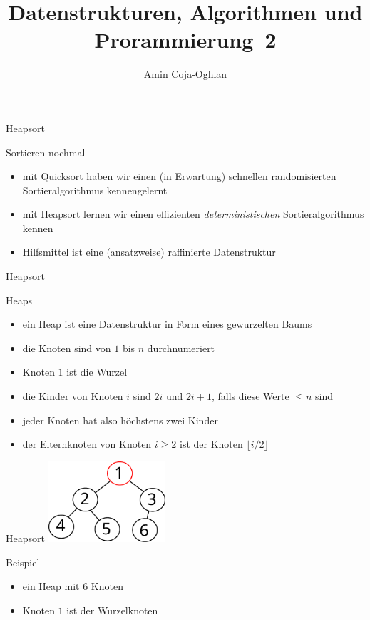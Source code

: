 \documentclass[aspectratio=1610, 11pt]{beamer}
\title{Datenstrukturen, Algorithmen und Prorammierung~2}
\author[A.~Coja-Oghlan]{Amin Coja-Oghlan}
\institute[DAP2]{Lehrstuhl Informatik 2\\Fakult\"at f\"ur Informatik}
\begin{document}
\maketitle

\begin{frame}{Heapsort}
	\begin{exampleblock}{Sortieren nochmal}
		\begin{itemize}
			\item mit Quicksort haben wir einen (in Erwartung) schnellen randomisierten Sortieralgorithmus kennengelernt
			\item mit Heapsort lernen wir einen effizienten \emph{deterministischen} Sortieralgorithmus kennen
			\item Hilfsmittel ist eine (ansatzweise) raffinierte Datenstruktur
		\end{itemize}
	\end{exampleblock}
\end{frame}

\begin{frame}{Heapsort}
	\begin{exampleblock}{Heaps}
		\begin{itemize}
			\item ein Heap ist eine Datenstruktur in Form eines gewurzelten Baums
			\item die Knoten sind von $1$ bis $n$ durchnumeriert
			\item Knoten $1$ ist die Wurzel
			\item die Kinder von Knoten $i$ sind $2i$ und $2i+1$, falls diese Werte $\leq n$ sind
			\item jeder Knoten hat also h\"ochstens zwei Kinder
			\item der Elternknoten von Knoten $i\geq2$ ist der Knoten $\lfloor i/2\rfloor$
		\end{itemize}
	\end{exampleblock}
\end{frame}

\begin{frame}{Heapsort}
	\hfill\includegraphics[height=30mm]{./images/heap.pdf}
	\begin{exampleblock}{Beispiel}
		\begin{itemize}
			\item ein Heap mit 6 Knoten
			\item Knoten $1$ ist der Wurzelknoten
		\end{itemize}
	\end{exampleblock}
\end{frame}
\end{document}
